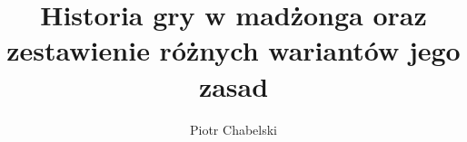 \documentclass[hidelinks,12pt]{wzmgr}
\author{Piotr Chabelski}
\title{Historia gry w madżonga oraz zestawienie różnych wariantów jego zasad}
\begin{document}
\onehalfspacing
\maketitle






\printindex


\end{document}
